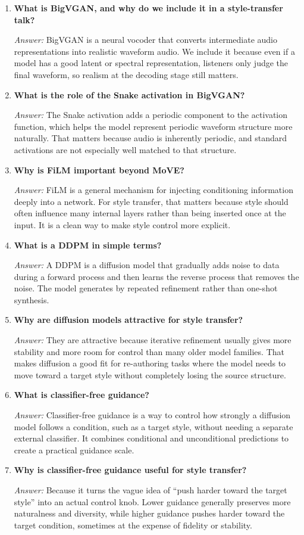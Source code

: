 \documentclass[11pt]{article}
\newcommand{\qa}[2]{
\item \textbf{#1}

\textit{Answer:} #2
}
\begin{document}
\begin{enumerate}[start=38]
\qa{What is BigVGAN, and why do we include it in a style-transfer talk?}{
BigVGAN is a neural vocoder that converts intermediate audio representations into realistic waveform audio. We include it because even if a model has a good latent or spectral representation, listeners only judge the final waveform, so realism at the decoding stage still matters.
}

\qa{What is the role of the Snake activation in BigVGAN?}{
The Snake activation adds a periodic component to the activation function, which helps the model represent periodic waveform structure more naturally. That matters because audio is inherently periodic, and standard activations are not especially well matched to that structure.
}

\qa{Why is FiLM important beyond MoVE?}{
FiLM is a general mechanism for injecting conditioning information deeply into a network. For style transfer, that matters because style should often influence many internal layers rather than being inserted once at the input. It is a clean way to make style control more explicit.
}

\qa{What is a DDPM in simple terms?}{
A DDPM is a diffusion model that gradually adds noise to data during a forward process and then learns the reverse process that removes the noise. The model generates by repeated refinement rather than one-shot synthesis.
}

\qa{Why are diffusion models attractive for style transfer?}{
They are attractive because iterative refinement usually gives more stability and more room for control than many older model families. That makes diffusion a good fit for re-authoring tasks where the model needs to move toward a target style without completely losing the source structure.
}

\qa{What is classifier-free guidance?}{
Classifier-free guidance is a way to control how strongly a diffusion model follows a condition, such as a target style, without needing a separate external classifier. It combines conditional and unconditional predictions to create a practical guidance scale.
}

\qa{Why is classifier-free guidance useful for style transfer?}{
Because it turns the vague idea of ``push harder toward the target style'' into an actual control knob. Lower guidance generally preserves more naturalness and diversity, while higher guidance pushes harder toward the target condition, sometimes at the expense of fidelity or stability.
}


\end{enumerate}
\end{document}
